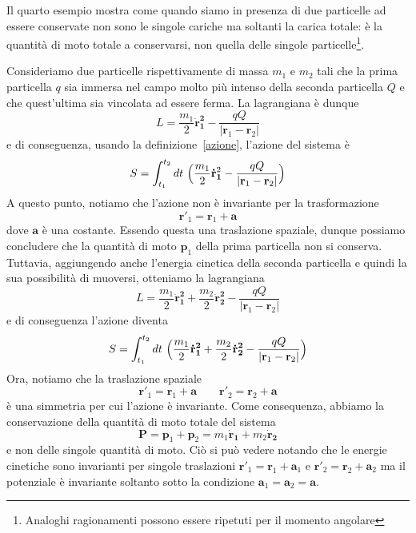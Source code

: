     Il quarto esempio mostra come quando siamo in presenza di due particelle ad essere conservate non sono le singole cariche ma soltanti la carica totale: è la quantità di moto totale a conservarsi, non quella delle singole particelle\footnote{Analoghi ragionamenti possono essere ripetuti per il momento angolare}. 

\begin{example}
    Consideriamo due particelle rispettivamente di massa $m_1$ e $m_2$ tali che la prima particella $q$ sia immersa nel campo molto più intenso della seconda particella $Q$ e che quest'ultima sia vincolata ad essere ferma. La lagrangiana è dunque 
\begin{equation*}
    L = \frac{m_1}{2} \mathbf{\dot r_1^2} - \frac{qQ}{|\mathbf r_1 - \mathbf r_2|}
\end{equation*}
    e di conseguenza, usando la definizione~\eqref{azione}, l'azione del sistema è
\begin{equation*}
    S = \int_{t_1}^{t_2}dt~ \Big( \frac{m_1}{2} \mathbf{\dot r_1}^2- \frac{qQ}{|\mathbf r_1 - \mathbf r_2|} \Big)
\end{equation*}
    A questo punto, notiamo che l'azione non è invariante per la trasformazione 
\begin{equation*}
    \mathbf r'_1 = \mathbf r_1 + \mathbf a
\end{equation*}
    dove $\mathbf a$ è una costante. Essendo questa una traslazione spaziale, dunque possiamo concludere che la quantità di moto $\mathbf p_1$ della prima particella non si conserva. Tuttavia, aggiungendo anche l'energia cinetica della seconda particella e quindi la sua possibilità di muoversi, otteniamo la lagrangiana  
\begin{equation*}
    L = \frac{m_1}{2} \mathbf{\dot r_1^2} + \frac{m_2}{2} \mathbf{\dot r_2^2} - \frac{qQ}{|\mathbf r_1 - \mathbf r_2|}
\end{equation*}
    e di conseguenza l'azione diventa
\begin{equation*}
    S = \int_{t_1}^{t_2}dt~ \Big( \frac{m_1}{2} \mathbf{\dot r_1^2} + \frac{m_2}{2} \mathbf{\dot r_2^2} - \frac{qQ}{|\mathbf r_1 - \mathbf r_2|} \Big)
\end{equation*}
    Ora, notiamo che la traslazione spaziale 
\begin{equation*}
    \mathbf r'_1 = \mathbf r_1 + \mathbf a \qquad \mathbf r'_2 = \mathbf r_2 + \mathbf a
\end{equation*}
    è una simmetria per cui l'azione è invariante. Come consequenza, abbiamo la conservazione della quantità di moto totale del sistema
\begin{equation*}
    \mathbf P = \mathbf p_1 + \mathbf p_2 = m_1 \mathbf{\dot r_1} + m_2 \mathbf{\dot r_2}
\end{equation*}
    e non delle singole quantità di moto. Ciò si può vedere notando che le energie cinetiche sono invarianti per singole traslazioni $\mathbf r'_1 = \mathbf r_1 + \mathbf a_1$ e $\mathbf r'_2 = \mathbf r_2 + \mathbf a_2$ ma il potenziale è invariante soltanto sotto la condizione $\mathbf a_1 = \mathbf a_2 = \mathbf a$.
\end{example}

